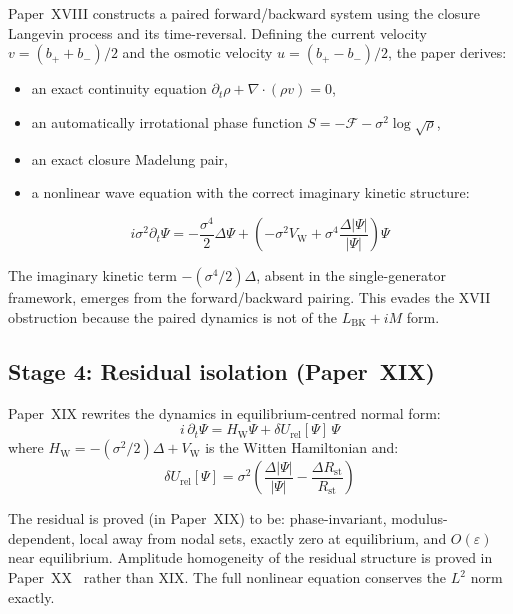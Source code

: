 \documentclass[12pt]{article}
\newcommand{\Fcal}{\mathcal{F}}
\newcommand{\VW}{V_{\mathrm{W}}}
\newcommand{\HW}{H_{\mathrm{W}}}
\newcommand{\Rst}{R_{\mathrm{st}}}
\newcommand{\dUrel}{\delta U_{\mathrm{rel}}}
\begin{document}
Paper~XVIII constructs a paired forward/backward system using the closure Langevin process and its time-reversal. Defining the current velocity $v = (b_+ + b_-)/2$ and the osmotic velocity $u = (b_+ - b_-)/2$, the paper derives:
\begin{itemize}
    \item an exact continuity equation $\partial_t\rho + \nabla\cdot(\rho v) = 0$,
    \item an automatically irrotational phase function $S = -\Fcal - \sigma^2\log\sqrt{\rho}$,
    \item an exact closure Madelung pair,
    \item a nonlinear wave equation with the correct imaginary kinetic structure:
\end{itemize}
\begin{equation}\label{eq:XVIII}
    i\sigma^2\partial_t\Psi = -\frac{\sigma^4}{2}\Delta\Psi + \left(-\sigma^2\VW + \sigma^4\frac{\Delta|\Psi|}{|\Psi|}\right)\Psi
\end{equation}

The imaginary kinetic term $-(\sigma^4/2)\Delta$, absent in the single-generator framework, emerges from the forward/backward pairing. This evades the XVII obstruction because the paired dynamics is not of the $L_{\mathrm{BK}} + iM$ form.

\subsection{Stage 4: Residual isolation (Paper~XIX)}

Paper~XIX rewrites the dynamics in equilibrium-centred normal form:
\begin{equation}\label{eq:XIX}
    i\,\partial_t\Psi = \HW\Psi + \dUrel[\Psi]\,\Psi
\end{equation}
where $\HW = -(\sigma^2/2)\Delta + \VW$ is the Witten Hamiltonian and:
\begin{equation}\label{eq:residual}
    \dUrel[\Psi] = \sigma^2\left(\frac{\Delta|\Psi|}{|\Psi|} - \frac{\Delta\Rst}{\Rst}\right)
\end{equation}

The residual is proved (in Paper~XIX) to be: phase-invariant, modulus-dependent, local away from nodal sets, exactly zero at equilibrium, and $O(\varepsilon)$ near equilibrium. Amplitude homogeneity of the residual structure is proved in Paper~XX~\citep{SmartXX} rather than XIX. The full nonlinear equation conserves the $L^2$ norm exactly.
\end{document}
